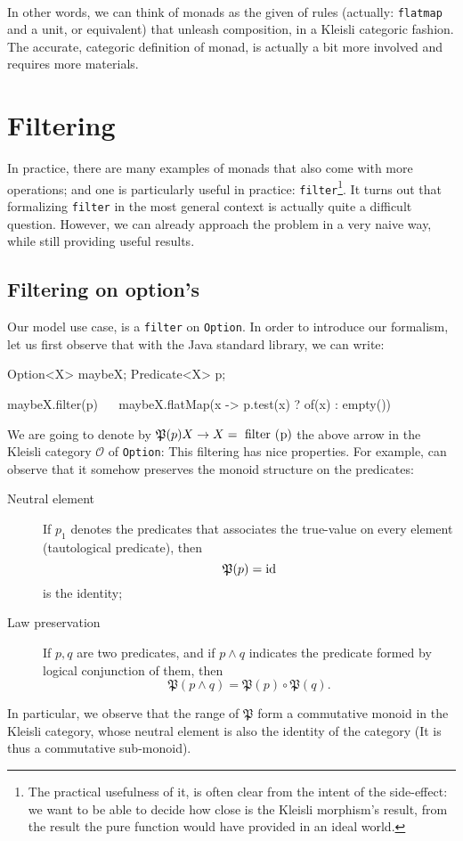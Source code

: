 \documentclass[12pt,a4paper]{report}
\renewcommand{\baselinestretch}{1.5}
\theoremstyle{theorem}
\theoremstyle{definition}
\begin{document}
~\\
In other words, we can think of monads as the given of rules
(actually: \lstinline{flatmap}{} and a unit, or equivalent)
that unleash composition, in a Kleisli categoric fashion.
The accurate, categoric definition of monad, is actually a bit more
involved and requires more materials.

\chapter{Filtering}

In practice, there are many examples of monads that also come with
more operations; and one is particularly useful in practice:
\lstinline{filter}{}\footnote{The practical usefulness of it, is often clear
from the intent of the side-effect: we want to be able to decide how close
is the Kleisli morphism's result, from the result the pure function
would have provided in an ideal world.}.
It turns out that formalizing \lstinline{filter}{} in the most 
general context is actually quite a difficult question.
However, we can already approach the problem in a very naive way,
while still providing useful results.

\section{Filtering on option's}

Our model use case, is a \lstinline{filter}{} on \lstinline{Option}{}.
In order to introduce our formalism, let us first observe
that with the Java standard library, we can write:

\renewcommand{\baselinestretch}{1} 
\selectfont

\begin{javacode}
Option<X> maybeX;
Predicate<X> p;

maybeX.filter(p)
 ~~ maybeX.flatMap(x -> p.test(x) ? of(x) : empty())
\end{javacode}

\renewcommand{\baselinestretch}{1.5} 
\selectfont

We are going to denote by $\mathfrak{P}(p)X\to X=\text{\lstinline{filter(p)}{}}$
the above
arrow in the Kleisli category $\mathscr{O}$ of \lstinline{Option}{}:
This filtering has nice properties. For example, can observe that
it somehow preserves the monoid structure on the predicates:
	\begin{description}
		\item[Neutral element] If $p_1$ denotes the predicates that
		associates the true-value on every element
		(tautological predicate), then
			\[ \mathfrak{P}(p) = {\rm id} \]
		is the identity;
		\item[Law preservation] If $p,q$ are two predicates, and if
		$p\wedge q$ indicates the predicate formed by logical
		conjunction of them, then
			\[ \mathfrak{P}(p\wedge q) = \mathfrak{P}(p)\circ \mathfrak{P}(q) .\]
	\end{description}
In particular, we observe that the range of $\mathfrak{P}$
form a commutative monoid in the Kleisli category, whose neutral element
is also the identity of the category (It is thus a commutative sub-monoid).
\end{document}
